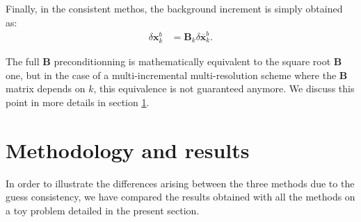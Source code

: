 \documentclass[npg, manuscript]{copernicus}
\begin{document}
Finally, in the consistent methos, the background increment is simply obtained as:
\begin{align}
\label{eq:alternative_B}
\delta \mathbf{x}^b_k & = \mathbf{B}_k \delta \overline{\mathbf{x}}^b_k.
\end{align}

The full $\mathbf{B}$ preconditionning is mathematically equivalent to the square root $\mathbf{B}$ one, but in the case of a multi-incremental multi-resolution scheme where the $\mathbf{B}$ matrix depends on $k$, this equivalence is not guaranteed anymore. We discuss this point in more details in section \ref{sec:res}.


\section{Methodology and results}
\label{sec:res}
In order to illustrate the differences arising between the three methods due to the guess consistency, we have compared the results obtained with all the methods on a toy problem detailed in the present section.
\end{document}
